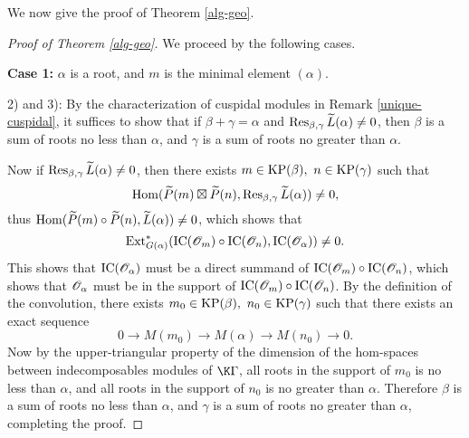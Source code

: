 We now give the proof of Theorem \ref{alg-geo}.

\begin{proof}[Proof of Theorem \ref{alg-geo}]
    We proceed by the following cases.

    \textbf{Case 1: }$\alpha$ is a root, and $m$ is the minimal element
    $(\alpha)$.

    2) and 3): By the characterization of cuspidal modules in Remark \ref{unique-cuspidal}, it suffices to show that 
    if $\beta+\gamma = \alpha$ and $\operatorname{Res}_{\beta,\gamma}\widetilde{L}(\alpha)
    \ne 0$, then $\beta$ is a sum of roots
    no less than $\alpha$, and $\gamma$ is a sum of roots no greater than
    $\alpha$.

    Now if $\operatorname{Res}_{\beta,\gamma}\widetilde{L}(\alpha)\ne 0$, then there exists
    $m\in\KP(\beta),\ n\in\KP(\gamma)$ such that $$\operatorname{Hom}(\widetilde{P}(m)
    \boxtimes\widetilde{P}(n),\operatorname{Res}_{\beta,\gamma}\widetilde{L}(\alpha))\ne 0,$$
    thus $\operatorname{Hom}(\widetilde{P}(m)
    \circ\widetilde{P}(n),\widetilde{L}(\alpha))\ne 0$,
    which shows that $$\operatorname{Ext}^*_{G(\alpha)}(\mathrm{IC}(\mathscr{O}_m)\circ\mathrm{IC}(\mathscr{O}_n),
    \mathrm{IC}(\mathscr{O}_{\alpha}))\ne 0.$$ This shows that $\mathrm{IC}(\mathscr{O}_{\alpha})$
    must be a direct summand of $\mathrm{IC}(\mathscr{O}_m)\circ\mathrm{IC}(\mathscr{O}_n)$,
    which shows that $\mathscr{O}_{\alpha}$ must be in the support of
    $\mathrm{IC}(\mathscr{O}_m)\circ\mathrm{IC}(\mathscr{O}_n)$. By the definition of the convolution, 
    there exists $m_0\in\operatorname{KP}(\beta),\ n_0\in\operatorname{KP}(\gamma)$
    such that there exists an exact sequence $$0\to M(m_0)
    \to M(\alpha)\to M(n_0)\to 0.$$ Now by the upper-triangular property
    of the dimension of the hom-spaces between indecomposables modules
    of $\K\Gamma$, all roots in the support of $m_0$ is no less than $\alpha$,
    and all roots in the support of $n_0$ is no greater than $\alpha$.
    Therefore $\beta$ is a sum of roots
    no less than $\alpha$, and $\gamma$ is a sum of roots no greater than
    $\alpha$, completing the proof.


\end{proof}
